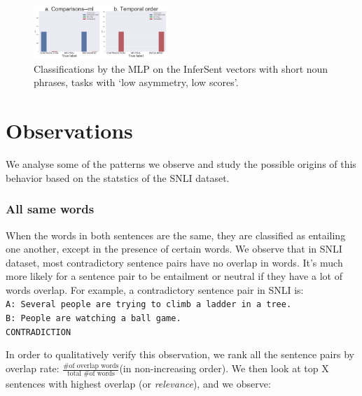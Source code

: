 \documentclass[10pt,letterpaper]{article}
\begin{document}
\begin{figure}[ht!]
\centering
\includegraphics[width=0.45\textwidth]{NNShortHistsInferSentMLP.png}
\caption{Classifications by the MLP on the InferSent vectors with short noun phrases, tasks with `low asymmetry, low scores'.}
\label{fig:IShistMLP-NN}
\end{figure}



\section{Observations}

We analyse some of the patterns we observe and study the possible origins of this behavior based on the statstics of the SNLI dataset.

\subsubsection{All same words}
When the words in both sentences are the same, they are classified as entailing one another, except in the presence of certain words. 
We observe that in SNLI dataset, most contradictory sentence pairs have no overlap in words. It's much more likely for a sentence pair to be entailment or neutral if they have a lot of words overlap. For example, a contradictory sentence pair in SNLI is:\\
{\tt A: Several people are trying to climb a ladder in a tree. \\ B: People are watching a ball game. \\ CONTRADICTION}

In order to qualitatively verify this observation, we rank all the sentence pairs by overlap rate: $\frac{\text{\# of overlap words}}{\text{total \# of words}}$(in non-increasing order). We then look at top X sentences with highest overlap (or \textit{relevance}), and we observe:
\end{document}

